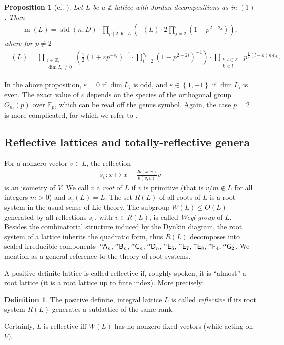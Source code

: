 \documentclass{amsart}
\newtheorem{prop}[thm]{Proposition}
\theoremstyle{definition}
\newtheorem{defn}[thm]{Definition}
\theoremstyle{remark}
\def\ZZ{\mathbb{Z}}
\def\FF{\mathbb{F}}
\newcommand{\xsA}[1]{\hspace{0.5mm}^{#1}\hspace*{-0.5mm}\mathsf A}
\newcommand{\xsB}[1]{\hspace{0.5mm}^{#1}\hspace*{-0.2mm}\mathsf B}
\newcommand{\xsC}[1]{\hspace{0.5mm}^{#1}\hspace*{-0.2mm}\mathsf C}
\newcommand{\xsD}[1]{\hspace{0.5mm}^{#1}\hspace*{-0.2mm}\mathsf D}
\newcommand{\xsE}[1]{\hspace{0.5mm}^{#1}\hspace*{-0.2mm}\mathsf E}
\newcommand{\xsF}[1]{\hspace{0.5mm}^{#1}\hspace*{-0.2mm}\mathsf F}
\newcommand{\xsG}[1]{\hspace{0.5mm}^{#1}\hspace*{-0.2mm}\mathsf G}
\DeclareMathOperator{\std}{std}
\DeclareMathOperator{\m}{m}
\DeclareMathOperator{\cp}{m_{p}}
\begin{document}
\begin{prop}[cf. \cite{cs88}]
 Let $L$ be a $\ZZ$-lattice with Jordan decompositions as in $(1)$. Then
 \begin{align*}
  \m(L) = \std(n,D) \cdot \prod_{p \mid 2\det L} \left( \cp(L) \cdot 2 \prod_{j=2}^{s}\left(1-p^{2-2j}\right) \right),
 \end{align*}
 where for $p \neq 2$
 \begin{align*}
  \cp(L) =\prod_{\substack{i \in \ZZ,\\ \dim L_i \neq 0}}\left(\tfrac{1}{2}\left(1+\varepsilon p^{-s_i}\right)^{-1} \cdot \prod_{i=2}^{s_i}\left(1-p^{2-2i}\right)^{-1}\right)
           \cdot \prod_{\substack{k,l \in \ZZ,\\ k<l}} p^{\tfrac{1}{2}(l-k)n_ln_k}.
 \end{align*}
\end{prop}
In the above proposition, $\varepsilon = 0$ if $\dim L_i$ is odd, and $\varepsilon \in \left\{1,-1 \right\}$ if $\dim L_i$ is even. The exact value of $\varepsilon$
depends on the species of the orthogonal group $O_{n_i}(p)$ over $\FF_p$, which can be read off the genus symbol. Again, the case $p=2$ is more complicated, for which we refer to \cite{cs88}.

\subsection{Reflective lattices and totally-reflective genera}
For a nonzero vector $v \in L$, the reflection
\begin{align*}
 s_v: x \longmapsto x - \frac{2b(x,v)}{b(v,v)}v
\end{align*}
is an isometry of $V$. We call $v$ a \emph{root} of $L$ if $v$ is primitive (that is $v/m \notin L$ for all integers $m > 0$) and $s_v(L) = L$. 
The set $R(L)$ of all roots of $L$ is a root system in the usual sense of Lie theory.
The subgroup $W(L) \leqslant O(L)$ generated by all reflections $s_v$, with $v \in R(L)$, is called \emph{Weyl group} of $L$.
Besides the combinatorial structure induced by the Dynkin diagram, the root system of a lattice inherits the quadratic form,
thus $R(L)$ decomposes into scaled irreducible components $\xsA{\alpha}_n, \xsB{\alpha}_n, \xsC{\alpha}_n, \xsD{\alpha}_n, 
\xsE{\alpha}_6, \xsE{\alpha}_7, \xsE{\alpha}_8, \xsF{\alpha}_4, \xsG{\alpha}_2$. We mention \cite{bou08} as a general reference to the theory of root systems.

A positive definite lattice is called reflective if, roughly spoken, it is ``almost'' a root lattice (it is a root lattice up to finte index). More precisely:
\begin{defn}
 The positive definite, integral lattice $L$ is called \emph{reflective} if its root system $R(L)$ generates a sublattice of the same rank.
\end{defn}
Certainly, $L$ is reflective iff $W(L)$ has no nonzero fixed vectors (while acting on $V$). 
\end{document}
